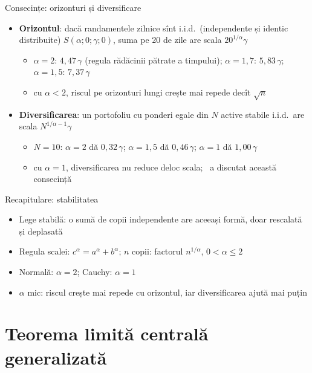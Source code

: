 \begin{frame}{Consecințe: orizonturi și diversificare}
\itemsize{\small}
\begin{itemize}
    \item \textbf{Orizontul}: dacă randamentele zilnice sînt i.i.d.\ (independente și identic distribuite) $S(\alpha; 0; \gamma; 0)$, suma pe 20 de zile are scala $20^{1/\alpha}\gamma$
    \begin{itemize}
        \item $\alpha = 2$: $4{,}47\,\gamma$ (regula rădăcinii pătrate a timpului); $\alpha = 1{,}7$: $5{,}83\,\gamma$; $\alpha = 1{,}5$: $7{,}37\,\gamma$
        \item cu $\alpha < 2$, riscul pe orizonturi lungi crește mai repede decît $\sqrt{n}$
    \end{itemize}
    \item \textbf{Diversificarea}: un portofoliu cu ponderi egale din $N$ active stabile i.i.d.\ are scala $N^{1/\alpha - 1}\gamma$
    \begin{itemize}
        \item $N = 10$: $\alpha = 2$ dă $0{,}32\,\gamma$; $\alpha = 1{,}5$ dă $0{,}46\,\gamma$; $\alpha = 1$ dă $1{,}00\,\gamma$
        \item cu $\alpha = 1$, diversificarea nu reduce deloc scala; \ a discutat această consecință
    \end{itemize}
\end{itemize}
\end{frame}

\begin{frame}{Recapitulare: stabilitatea}
\itemsize{\small}
\begin{itemize}
    \item Lege stabilă: o sumă de copii independente are aceeași formă, doar rescalată și deplasată
    \item Regula scalei: $c^\alpha = a^\alpha + b^\alpha$; $n$ copii: factorul $n^{1/\alpha}$, $0 < \alpha \le 2$
    \item Normală: $\alpha = 2$; Cauchy: $\alpha = 1$
    \item $\alpha$ mic: riscul crește mai repede cu orizontul, iar diversificarea ajută mai puțin
\end{itemize}
\end{frame}


\section{Teorema limită centrală generalizată}

